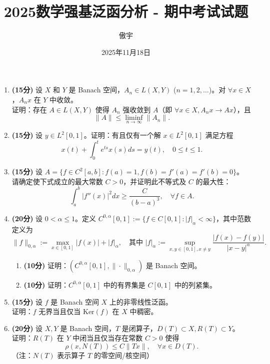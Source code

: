 \documentclass[11pt, a4paper]{article}
\title{\textbf{2025数学强基泛函分析 - 期中考试试题}}
\author{傲宇}
\date{2025年11月18日}
\begin{document}
	
	\maketitle
	
	\begin{enumerate}
		\item \textbf{(15分)} 设 $X$ 和 $Y$ 是 Banach 空间，$A_n \in L(X, Y)$ ($n=1,2,\dots$)。对 $\forall x \in X$，$A_n x$ 在 $Y$ 中收敛。\\
		证明：存在 $A \in L(X, Y)$ 使得 $A_n$ 强收敛到 $A$（即 $\forall x \in X, A_n x \to Ax$），且
		$$ \|A\| \le \liminf_{n\to\infty} \|A_n\|. $$
		
		\item \textbf{(15分)} 设 $y \in L^2[0,1]$。证明：有且仅有一个解 $x \in L^2[0,1]$ 满足方程
		$$ x(t) + \int_{0}^{t} e^{ts} x(s) ds = y(t), \quad 0 \le t \le 1. $$
		
		\item \textbf{(15分)} 设 $A = \{ f \in C^2[a,b] : f(a)=1, f(b)=f'(a)=f'(b)=0 \}$。\\
		请确定使下式成立的最大常数 $C>0$，并证明此不等式及 $C$ 的最大性：
		$$ \int_{a}^{b} |f''(x)|^2 dx \ge \frac{C}{(b-a)^3}, \quad \forall f \in A. $$
		
		\item \textbf{(20分)} 设 $0 < \alpha \le 1$。定义 $C^{0,\alpha}[0,1] := \{ f \in C[0,1] : |f|_\alpha < \infty \}$，其中范数定义为
		$$ \|f\|_{0,\alpha} := \max_{x\in[0,1]}|f(x)| + |f|_\alpha, \quad \text{其中 } |f|_\alpha := \sup_{x,y\in[0,1], x\ne y} \frac{|f(x)-f(y)|}{|x-y|^\alpha}. $$
		\begin{enumerate}
			\item[(1)] \textbf{(10分)} 证明：$(C^{0,\alpha}[0,1], \|\cdot\|_{0,\alpha})$ 是 Banach 空间。
			\item[(2)] \textbf{(10分)} 证明：$C^{0,\alpha}[0,1]$ 中的有界集是 $C[0,1]$ 中的列紧集。
		\end{enumerate}
		
		\item \textbf{(15分)} 设 $f$ 是 Banach 空间 $X$ 上的非零线性泛函。\\
		证明：$f$ 无界当且仅当 $\text{Ker}(f)$ 在 $X$ 中稠密。
		
		\item \textbf{(20分)} 设 $X, Y$ 是 Banach 空间，$T$ 是闭算子，$D(T) \subset X, R(T) \subset Y$。\\
		证明：$R(T)$ 在 $Y$ 中闭当且仅当存在常数 $C>0$ 使得
		$$ \rho(x, N(T)) \le C \|Tx\|, \quad \forall x \in D(T). $$
		（注：$N(T)$ 表示算子 $T$ 的零空间/核空间）
		
	\end{enumerate}
	
\end{document}
